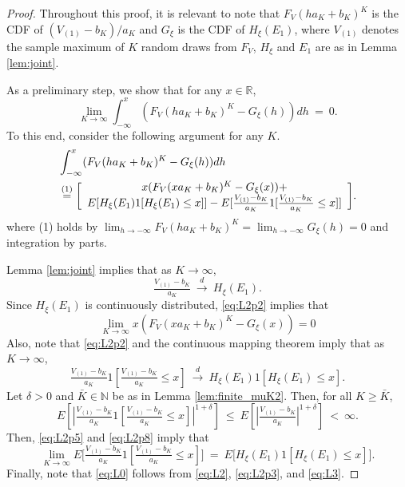 \begin{proof}
Throughout this proof, it is relevant to note that ${F_{V}(ha_{K}+b_{K})^{K}}$ is the CDF of $(V_{(1)}-b_{K})/a_{K}$ and $G_{\xi }$ is the CDF of $H_{\xi }(E_{1})$, where $V_{(1)}$ denotes the sample maximum of $K$ random draws from $F_{V}$, $H_{\xi }$ and $E_{1}$ are as in Lemma \ref{lem:joint}. 

As a preliminary step, we show that for any $x\in \mathbb{R}$, 
\begin{equation}
\lim_{K \to \infty} \int_{-\infty }^{x}({F_{V}(ha_{K}+b_{K})^{K}}-G_{\xi }(h))dh~= ~0 .  \label{eq:L0}
\end{equation}
To this end, consider the following argument for any $K$.
\begin{align}
&\int_{-\infty }^{x}({F_{V}(ha_{K}+b_{K})^{K}}-G_{\xi }(h))dh~  \notag \\
&\overset{(1)}{=} 
\bigg[\begin{array}{c}
x({F_{V}(xa_{K}+b_{K})^{K}}-G_{\xi }(x))+\\
{{E[H_{\xi }(E_{1})1}[ {H_{\xi }(E_{1})\leq x}] ]}-{{E[\tfrac{V_{(1)}-b_{K}}{a_{K}}1}[\tfrac{V_{(1)}-b_{K}}{a_{K}}\leq x] ]}
\end{array}\bigg].  \label{eq:L2}
\end{align}%
where (1) holds by $\lim_{h \to -\infty}{F_{V}(ha_{K}+b_{K})^{K}}=\lim_{h \to -\infty}G_{\xi }(h)=0$ and integration by parts.

Lemma \ref{lem:joint} implies that as $K\to \infty $, 
\begin{equation}
\tfrac{{V_{(1)}-b_{K}}}{{a_{K}}}~\overset{d}{\to }~H_{\xi }(E_{1}).
\label{eq:L2p2}
\end{equation}
Since $H_{\xi }(E_{1})$ is continuously distributed, \eqref{eq:L2p2} implies that
\begin{equation}
\lim_{K\to \infty }x({F_{V}(xa_{K}+b_{K})^{K}}-G_{\xi }(x))=0
\label{eq:L2p3}
\end{equation}
Also, note that \eqref{eq:L2p2} and the continuous mapping theorem imply that as $K\to \infty $, 
\begin{equation}
{\tfrac{V_{(1)}-b_{K}}{a_{K}}1}[ \tfrac{V_{(1)}-b_{K}}{a_{K}}\leq x] ~\overset{d}{\to }~{H_{\xi }(E_{1})1}[ {H_{\xi
}(E_{1})\leq x}] .  \label{eq:L2p5}
\end{equation}
Let $\delta >0$ and $\bar{K}\in \mathbb{N}$ be as in Lemma \ref{lem:finite_muK2}. Then, for all $K\geq \bar{K}$, 
\begin{equation}
E[|{\tfrac{V_{(1)}-b_{K}}{a_{K}}1}[ \tfrac{V_{(1)}-b_{K}}{a_{K}}\leq x] |^{1+\delta }]~\leq ~E[|\tfrac{{V_{(1)}-b_{K}}}{{a_{K}}}|^{1+\delta }]~<~\infty .  \label{eq:L2p8}
\end{equation}
Then, \eqref{eq:L2p5} and \eqref{eq:L2p8} imply that 
\begin{equation}
\lim_{K\to \infty }{E[\tfrac{V_{(1)}-b_{K}}{a_{K}}1}[ \tfrac{V_{(1)}-b_{K}}{a_{K}}\leq x]] ~=~{E[H_{\xi }(E_{1})1}[ {H_{\xi}(E_{1})\leq x}]].  \label{eq:L3}
\end{equation}
Finally, note that \eqref{eq:L0} follows from \eqref{eq:L2}, \eqref{eq:L2p3}, and \eqref{eq:L3}.


\end{proof}
